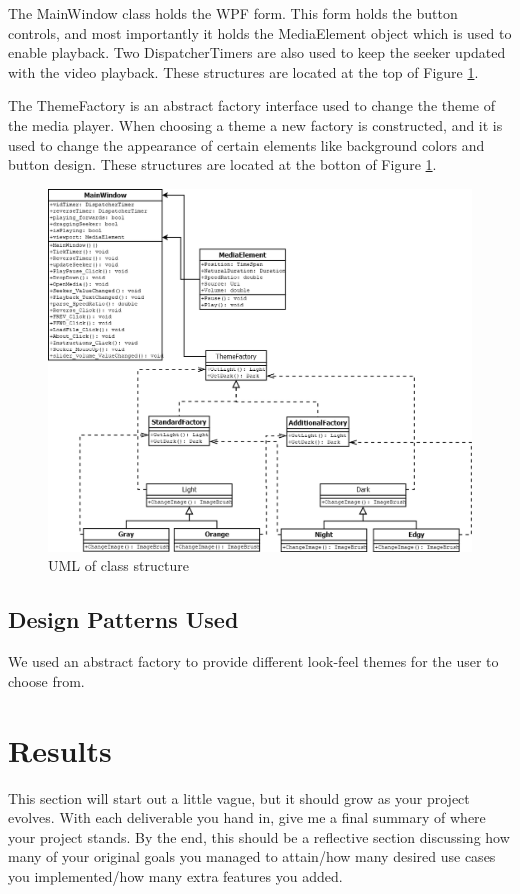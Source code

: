 \documentclass[10pt,conference,onecolumn,compsoc]{IEEEtran}
\begin{document}
The MainWindow class holds the WPF form. This form holds the button controls, and most importantly it holds the MediaElement object which is used to enable playback. Two DispatcherTimers are also used to keep the seeker updated with the video playback. These structures are located at the top of Figure \ref{UML}.\par
The ThemeFactory is an abstract factory interface used to change the theme of the media player. When choosing a theme a new factory is constructed, and it is used to change the appearance of certain elements like background colors and button design. These structures are located at the botton of Figure \ref{UML}.
\begin{figure}[H]
\begin{center}
\includegraphics[scale=0.4]{MediaPlayerUML.png}
\caption{UML of class structure}
\label{UML}
\end{center}
\end{figure}


\subsection{Design Patterns Used}
We used an abstract factory to provide different look-feel themes for the user to choose from. 


\section{Results}
This section will start out a little vague, but it should grow as your project evolves.  With each deliverable you hand in, give me a final summary of where your project stands.  By the end, this should be a reflective section discussing how many of your original goals you managed to attain/how many desired use cases you implemented/how many extra features you added.
\end{document}

